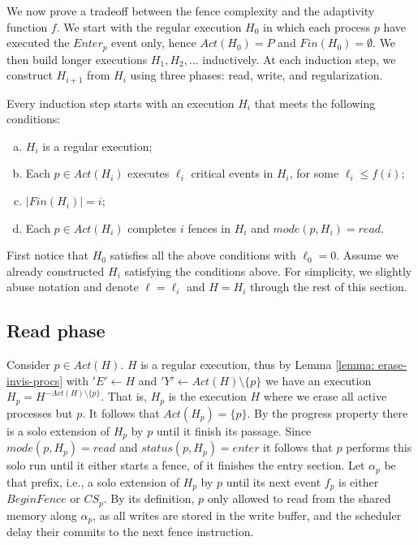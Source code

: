 We now prove a tradeoff between the fence complexity and the adaptivity function $f$.
We start with the regular execution $H_0$ in which each process $p$ have executed the $Enter_p$ event only, hence $Act(H_0)=P$ and $Fin(H_0)=\emptyset$. We then build longer executions $H_1,H_2,...$ inductively. At each induction step, we construct $H_{i+1}$ from $H_i$ using three phases: read, write, and regularization.

Every induction step starts with an execution $H_i$ that meets the following conditions:

\begin{enumerate}[(a)]
	\item $H_i$ is a regular execution;
	\item Each $p \in Act(H_i)$ executes $\ell_i$ critical events in $H_i$, for some $\ell_i \leq f(i)$;
	\item $|Fin(H_i)| = i$;
	\item Each $p \in Act(H_i)$ completes $i$ fences in $H_i$ and $mode(p,H_i) = read$.
\end{enumerate}

First notice that $H_0$ satisfies all the above conditions with $\ell_0 = 0$. Assume we already constructed $H_i$ satisfying the conditions above. For simplicity, we slightly abuse notation and denote $\ell = \ell_i$ and $H = H_i$ through the rest of this section.





\newpage
\subsection{Read phase} \label{subsec:read-phase}

Consider $p \in Act(H)$. $H$ is a regular execution, thus by Lemma \ref{lemma: erase-invis-procs} with $'E' \leftarrow H$ and $'Y' \leftarrow Act(H) \setminus \{p\}$ we have an execution $H_p = H^{-Act(H) \setminus \{p\}}$. That is, $H_p$ is the execution $H$ where we erase all active processes but $p$. It follows that $Act(H_p) = \{p\}$.
By the progress property there is a solo extension of $H_p$ by $p$ until it finish its passage. Since $mode(p,H_p) = read$ and $status(p,H_p) = enter$ it follows that $p$ performs this solo run until it either starts a fence, of it finishes the entry section. Let $\alpha_p$ be that prefix, i.e., a solo extension of $H_p$ by $p$ until its next event $f_p$ is either $BeginFence$ or $CS_p$.
By its definition, $p$ only allowed to read from the shared memory along $\alpha_p$, as all writes are stored in the write buffer, and the scheduler delay their commits to the next fence instruction.

